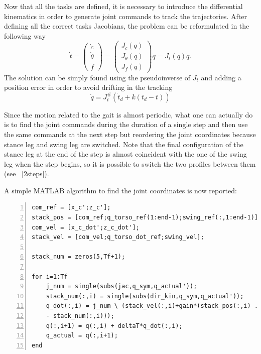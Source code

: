 \documentclass[11pt]{article}
\begin{document}
Now that all the tasks are defined, it is necessary to introduce the differential kinematics in order to generate joint commands to track the trajectories. After defining all the correct tasks Jacobians, the problem can be reformulated in the following way
\begin{equation}
\label{eqn:stack_of_tasks}
\dot{t} = \begin{pmatrix}
\dot{c}\\
\dot{\theta}\\
\dot{f}
\end{pmatrix} = \begin{pmatrix}
J_c(q)\\
J_{\theta}(q)\\
J_f(q)
\end{pmatrix}\dot{q} = J_t(q)\dot{q}.
\end{equation}
The solution can be simply found using the pseudoinverse of $J_t$ and adding a position error in order to avoid drifting in the tracking
\begin{equation}
\label{eqn:vel_command}
\dot{q} = J_t^\#(\dot{t}_d + k(t_d-t))
\end{equation}

Since the motion related to the gait is almost periodic, what one can actually do is to find the joint commands during the duration of a single step and then use the same commands at the next step but reordering the joint coordinates because stance leg and swing leg are switched. Note that the final configuration of the stance leg at the end of the step is almost coincident with the one of the swing leg when the step begins, so it is possible to switch the two profiles between them (see \figurename~\ref{2steps}). 

A simple MATLAB algorithm to find the joint coordinates is now reported:

\begin{Verbatim}[tabsize = 4, frame = lines, numbers = left]
com_ref = [x_c';z_c'];
stack_pos = [com_ref;q_torso_ref(1:end-1);swing_ref(:,1:end-1)];
com_vel = [x_c_dot';z_c_dot'];
stack_vel = [com_vel;q_torso_dot_ref;swing_vel];

stack_num = zeros(5,Tf+1);

for i=1:Tf
    j_num = single(subs(jac,q_sym,q_actual'));
    stack_num(:,i) = single(subs(dir_kin,q_sym,q_actual'));
    q_dot(:,i) = j_num \ (stack_vel(:,i)+gain*(stack_pos(:,i) ...
    - stack_num(:,i)));
    q(:,i+1) = q(:,i) + deltaT*q_dot(:,i);
    q_actual = q(:,i+1);
end
\end{Verbatim}
\end{document}
